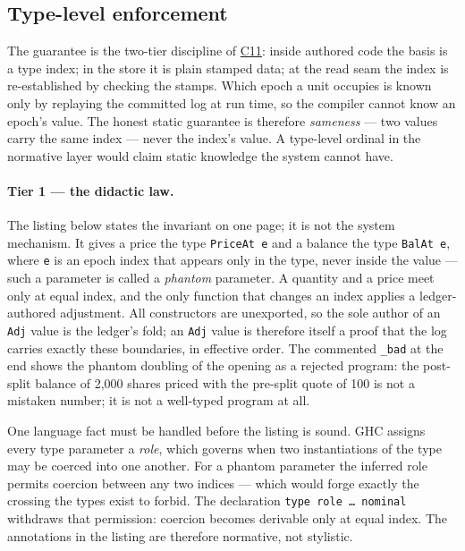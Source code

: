 \subsection{Type-level enforcement}
\label{sec:basis-types}

The guarantee is the two-tier discipline of \hyperref[cond:C11]{C11}: inside
authored code the basis is a type index; in the store it is plain stamped data;
at the read seam the index is re-established by checking the stamps. Which
epoch a unit occupies is known only by replaying the committed log at run time,
so the compiler cannot know an epoch's value. The honest static guarantee is
therefore \emph{sameness} --- two values carry the same index --- never the
index's value. A type-level ordinal in the normative layer would claim static
knowledge the system cannot have.

\paragraph{Tier 1 --- the didactic law.} The listing below states the invariant
on one page; it is not the system mechanism. It gives a price the type
\texttt{PriceAt e} and a balance the type \texttt{BalAt e}, where \texttt{e} is
an epoch index that appears only in the type, never inside the value --- such a
parameter is called a \emph{phantom} parameter. A quantity and a price meet
only at equal index, and the only function that changes an index applies a
ledger-authored adjustment. All constructors are unexported, so the sole author
of an \texttt{Adj} value is the ledger's fold; an \texttt{Adj} value is
therefore itself a proof that the log carries exactly these boundaries, in
effective order. The commented \texttt{\_bad} at the end shows the phantom
doubling of the opening as a rejected program: the post-split balance of 2,000
shares priced with the pre-split quote of 100 is not a mistaken number; it is not a
well-typed program at all.

One language fact must be handled before the listing is sound. GHC assigns
every type parameter a \emph{role}, which governs when two instantiations of
the type may be coerced into one another. For a phantom parameter the inferred
role permits coercion between any two indices --- which would forge exactly the
crossing the types exist to forbid. The declaration \texttt{type role \dots\
nominal} withdraws that permission: coercion becomes derivable only at equal
index. The annotations in the listing are therefore normative, not stylistic.

